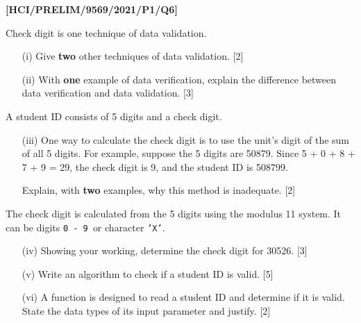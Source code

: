 \item \textbf{{[}HCI/PRELIM/9569/2021/P1/Q6{]}}

Check digit is one technique of data validation. 
\begin{enumerate}
\item[(i)]  Give \textbf{two} other techniques of data validation.\hfill{}
{[}2{]}
\item[(ii)]  With \textbf{one} example of data verification, explain the difference
between data verification and data validation. \hfill{}{[}3{]}
\end{enumerate}
A student ID consists of 5 digits and a check digit. 
\begin{enumerate}
\item[(iii)]  One way to calculate the check digit is to use the unit\textquoteright s
digit of the sum of all 5 digits. For example, suppose the 5 digits
are 50879. Since 5 + 0 + 8 + 7 + 9 = 29, the check digit is 9, and
the student ID is 508799. 

Explain, with \textbf{two} examples, why this method is inadequate.
\hfill{}{[}2{]}
\end{enumerate}
The check digit is calculated from the 5 digits using the modulus
11 system. It can be digits \texttt{0 - 9 }or character \texttt{'X'}. 
\begin{enumerate}
\item[(iv)]  Showing your working, determine the check digit for 30526. \hfill{}{[}3{]}
\item[(v)]  Write an algorithm to check if a student ID is valid. \hfill{}{[}5{]}
\item[(vi)]  A function is designed to read a student ID and determine if it
is valid. State the data types of its input parameter and justify.
\hfill{}{[}2{]}
\end{enumerate}
